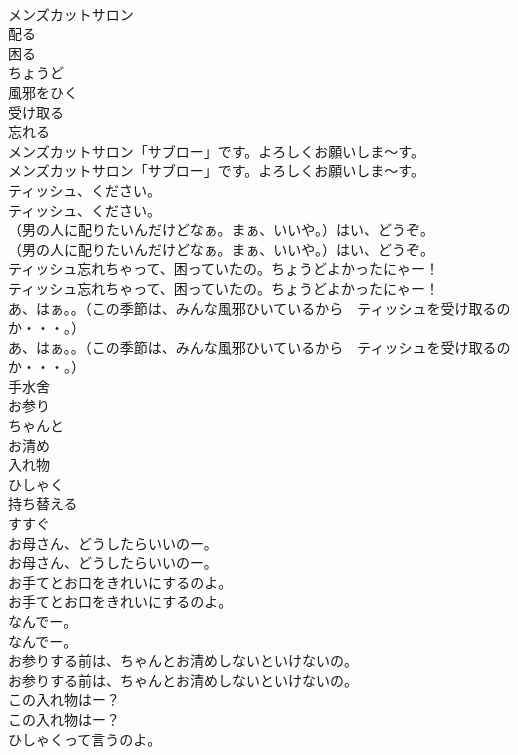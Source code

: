 \documentclass[8pt]{extreport}
\begin{document}
\begin{CJK}{UTF8}{min}
\\	メンズカットサロン
\\	配る
\\	困る
\\	ちょうど
\\	風邪をひく
\\	受け取る
\\	忘れる
\\	メンズカットサロン「サブロー」です。よろしくお願いしま～す。	
\\	メンズカットサロン「サブロー」です。よろしくお願いしま～す。 
\\	ティッシュ、ください。	
\\	ティッシュ、ください。 
\\	（男の人に配りたいんだけどなぁ。まぁ、いいや。）はい、どうぞ。	
\\	（男の人に配りたいんだけどなぁ。まぁ、いいや。）はい、どうぞ。 
\\	ティッシュ忘れちゃって、困っていたの。ちょうどよかったにゃー！	
\\	ティッシュ忘れちゃって、困っていたの。ちょうどよかったにゃー！ 
\\	あ、はぁ。。（この季節は、みんな風邪ひいているから　ティッシュを受け取るのか・・・。）	
\\	あ、はぁ。。（この季節は、みんな風邪ひいているから　ティッシュを受け取るのか・・・。） 
\\	手水舍
\\	お参り
\\	ちゃんと
\\	お清め
\\	入れ物
\\	ひしゃく
\\	持ち替える
\\	すすぐ
\\	お母さん、どうしたらいいのー。	
\\	お母さん、どうしたらいいのー。 
\\	お手てとお口をきれいにするのよ。	
\\	お手てとお口をきれいにするのよ。 
\\	なんでー。	
\\	なんでー。 
\\	お参りする前は、ちゃんとお清めしないといけないの。	
\\	お参りする前は、ちゃんとお清めしないといけないの。 
\\	この入れ物はー？	
\\	この入れ物はー？ 
\\	ひしゃくって言うのよ。	

\end{CJK}
\end{document}
